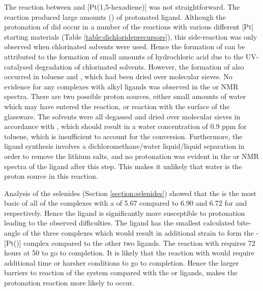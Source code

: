The reaction between \tBusixantphos{} and [Pt(1,5-hexadiene)] was not straightforward.  The reaction produced large amounts () of protonated \tBusixantphos{} ligand.  Although the protonation of \tButhixantphos{} did occur in a number of the reactions with various different [Pt] starting materials (Table \ref{table:dichlorideprecursors}), this side-reaction was only observed when chlorinated solvents were used.  Hence the formation of \tButhixantphos {} can be attributed to the formation of small amounts of hydrochloric acid due to the UV-catalysed degradation of chlorinated solvents.  However, the formation of \tBusixantphos {} also occurred in toluene and , which had been dried over molecular sieves.  No evidence for any complexes with alkyl ligands was observed in the \proton{} or \carbon{} NMR spectra.  There are two possible proton sources, either small amounts of water which may have entered the reaction, or reaction with the surface of the glassware.  The solvents were all degassed and dried over molecular sieves in accordance with , which should result in a water concentration of 0.9 ppm for toluene, which is insufficient to account for the conversion.\cite{Williams2010}  Furthermore, the \tBusixantphos{} ligand synthesis involves a dichloromethane/water liquid/liquid separation in order to remove the lithium salts, and no protonation was evident in the \proton{} or \phosphorus{} NMR spectra of the \tBusixantphos{} ligand after this step.  This makes it unlikely that water is the proton source in this reaction.  

Analysis of the \tBuxantphos{} selenides (Section \ref{section:selenides}) showed that the \tBusixantphos{} is the most basic of all of the complexes with a \pKb{} of 5.67 compared to 6.90 and 6.72 for \tButhixantphos{} and \tBuxantphos{} respectively.  Hence the \tBusixantphos{} ligand is significantly more susceptible to protonation leading to the observed difficulties.  The \tBusixantphos{} ligand has the smallest calculated bite-angle of the three complexes \fixme{(\tBusixantphos{} = 126.90\degrees, \tButhixantphos{} = 126.96\degrees, \tBuxantphos{} = 159.93\degrees)} which would result in additional strain to form the \trans-[Pt(\tBusixantphos)] complex compared to the other two ligands.  The reaction with \tButhixantphos{} requires 72 hours at 50 \degC{} to go to completion.  It is likely that the reaction with \tBusixantphos{} would require additional time or harsher conditions to go to completion.  Hence the larger barriers to reaction of the \tBusixantphos{} system compared with the \tButhixantphos{} or \tBuxantphos{} ligands, makes the protonation reaction more likely to occur.  


